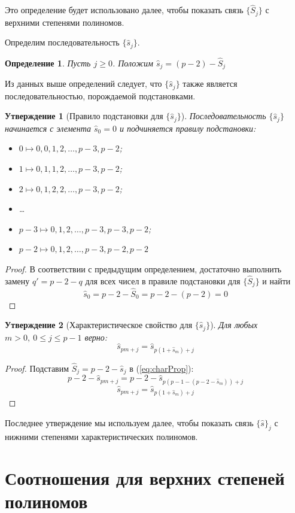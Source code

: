 \documentclass[14pt, a4paper, russian]{report}
\newtheorem{definition}{\indent Определение}
\newtheorem{proposition}{\indent Утверждение}
\begin{document}
Это определение будет использовано далее, чтобы показать связь $\{\hat{S}_j\}$ с верхними степенями полиномов.

Определим последовательность $\{\hat{s}_j\}$.
\begin{definition}\label{small_s}
Пусть $j \ge 0$. Положим $\hat{s}_j = (p-2)-\hat{S}_j$
\end{definition}

Из данных выше определений следует, что $\{\hat{s}_j\}$ также является последовательностью, порождаемой подстановками.

\begin{proposition}[Правило подстановки для $\{\hat{s}_j\}$]
Последовательность $\{\hat{s}_j\}$ начинается с элемента $\hat{s}_0=0$ и подчиняется правилу подстановки:
\begin{itemize}
 \item $0 \mapsto 0, 0, 1, 2, \ldots, p-3, p-2$;
 \item $1 \mapsto 0, 1, 1, 2, \ldots, p-3, p-2$;
 \item $2 \mapsto 0, 1, 2, 2, \ldots, p-3, p-2$;
 \item \ldots
 \item $p-3 \mapsto 0, 1, 2, \ldots, p-3, p-3, p-2$;
 \item $p-2 \mapsto 0, 1, 2, \ldots, p-3, p-2, p-2$
 \end{itemize}
\end{proposition}
\begin{proof}
В соответствии с предыдущим определением, достаточно выполнить замену $q' = p-2-q$ для всех чисел в правиле подстановки для $\{\hat{S}_j\}$ и найти $$\hat{s}_0 = p-2-\hat{S}_0 = p-2 - (p-2) = 0$$
\end{proof}

\begin{proposition}[Характеристическое свойство для $\{\hat{s}_j\}$]
Для любых $m > 0,\ 0 \le j \le p-1$ верно: $$\hat{s}_{pm+j}=\hat{s}_{p(1+\hat{s}_m) + j}$$
\end{proposition}
\begin{proof}
Подставим $\hat{S}_j = p-2-\hat{s}_j$ в (\ref{eq:charProp}):
$$p-2-\hat{s}_{pm+j}=p-2-\hat{s}_{p(p-1-(p-2-\hat{s}_m)) + j}$$
$$\hat{s}_{pm+j} = \hat{s}_{p(1+\hat{s}_m)+j}$$
\end{proof}

Последнее утверждение мы используем далее, чтобы показать связь $\{\hat{s}\}_j$ с нижними степенями характеристических полиномов.

\section{Соотношения для верхних степеней полиномов}
\end{document}
